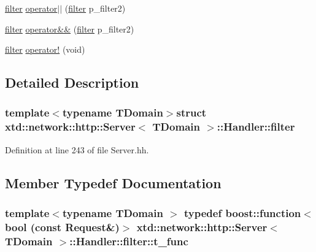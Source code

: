 \begin{DoxyCompactItemize}
\item 
\hyperlink{structxtd_1_1network_1_1http_1_1Server_1_1Handler_1_1filter}{filter} \hyperlink{structxtd_1_1network_1_1http_1_1Server_1_1Handler_1_1filter_ae316eebe468b22abad9de206ba83f645}{operator$\vert$$\vert$} (\hyperlink{structxtd_1_1network_1_1http_1_1Server_1_1Handler_1_1filter}{filter} p\-\_\-filter2)
\item 
\hyperlink{structxtd_1_1network_1_1http_1_1Server_1_1Handler_1_1filter}{filter} \hyperlink{structxtd_1_1network_1_1http_1_1Server_1_1Handler_1_1filter_acb290fb0ddab57714d49d655449fd09c}{operator\&\&} (\hyperlink{structxtd_1_1network_1_1http_1_1Server_1_1Handler_1_1filter}{filter} p\-\_\-filter2)
\item 
\hyperlink{structxtd_1_1network_1_1http_1_1Server_1_1Handler_1_1filter}{filter} \hyperlink{structxtd_1_1network_1_1http_1_1Server_1_1Handler_1_1filter_a3f106fe22b957b56081a8c82a24c57fe}{operator!} (void)
\end{DoxyCompactItemize}


\subsection{Detailed Description}
\subsubsection*{template$<$typename T\-Domain$>$struct xtd\-::network\-::http\-::\-Server$<$ T\-Domain $>$\-::\-Handler\-::filter}



Definition at line 243 of file Server.\-hh.



\subsection{Member Typedef Documentation}
\hypertarget{structxtd_1_1network_1_1http_1_1Server_1_1Handler_1_1filter_a9eae862874b2dfece23fb42bf772110a}{
\subsubsection[{t\-\_\-func}]{\setlength{\rightskip}{0pt plus 5cm}template$<$typename T\-Domain $>$ typedef boost\-::function$<$bool (const {\bf Request}\&)$>$ {\bf xtd\-::network\-::http\-::\-Server}$<$ T\-Domain $>$\-::{\bf Handler\-::filter\-::t\-\_\-func}}}\label{structxtd_1_1network_1_1http_1_1Server_1_1Handler_1_1filter_a9eae862874b2dfece23fb42bf772110a}


